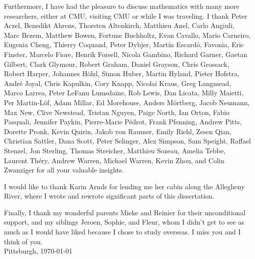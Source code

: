 Furthermore, I have had the pleasure to discuss mathematics with many more researchers, either at CMU, visiting CMU or while I was traveling. I thank Peter Aczel, Benedikt Ahrens, Thorsten Altenkirch, Matthieu Anel, Carlo Angiuli, Marc Bezem, Matthew Bowen, Fortune Buchholtz, Evan Cavallo, Mario Carneiro, Eugenia Cheng, Thierry Coquand, Peter Dybjer, Mart\'in Escard\'o, Favonia, Eric Finster, Marcelo Fiore, Henrik Forsell, Nicola Gambino, Richard Garner, Gaetan Gilbert, Clark Glymour, Robert Graham, Daniel Grayson, Chris Grossack, Robert Harper, Johannes H\"olzl, Simon Huber, Martin Hyland, Pieter Hofstra, André Joyal, Chris Kapulkin, Cory Knapp, Nicolai Kraus, Greg Langmead, Marco Larrea, Peter LeFanu Lumsdaine, Rob Lewis, Dan Licata, Milly Maietti, Per Martin-L\"of, Adam Millar, Ed Morehouse, Anders Mörtberg, Jacob Neumann, Max New, Clive Newstead, Tristan Nguyen, Paige North, Ian Orton, Fabio Pasquali, Jennifer Paykin, Pierre-Marie Pédrot, Frank Pfenning, Andrew Pitts, Dorette Pronk, Kevin Quirin, Jakob von Raumer, Emily Riehl, Zesen Qian, Christian Sattler, Dana Scott, Peter Selinger, Alex Simpson, Sam Speight, Raffael Stenzel, Jon Sterling, Thomas Streicher, Matthieu Sozeau, Amelia Tebbe, Laurent Théry, Andrew Warren, Michael Warren, Kevin Zhou, and Colin Zwanziger for all your valuable insights.

I would like to thank Karin Arnds for lending me her cabin along the Allegheny River, where I wrote and rewrote significant parts of this dissertation.

Finally, I thank my wonderful parents Mieke and Reinier for their unconditional support, and my siblings Jeroen, Sophie, and Fleur, whom I didn't get to see as much as I would have liked because I chose to study overseas. I miss you and I think of you.\\[2em]


\noindent \hfill Pittsburgh, \today
